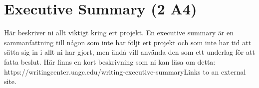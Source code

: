 \section{Executive Summary (2 A4)}
Här beskriver ni allt viktigt kring ert projekt. En executive summary är en sammanfattning till någon som inte har följt ert projekt och som inte har tid att sätta sig in i allt ni har gjort, men ändå vill använda den som ett underlag för att fatta beslut. Här finns en kort beskrivning som ni kan läsa om detta: https://writingcenter.uagc.edu/writing-executive-summaryLinks to an external site.